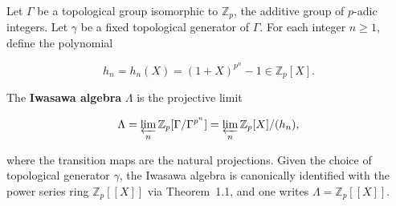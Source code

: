 Let $\Gamma$ be a topological group isomorphic to $\mathbb{Z}_p$, the additive group of $p$-adic integers. Let $\gamma$ be a fixed topological generator of $\Gamma$. For each integer $n \geq 1$, define the polynomial

$$h_n = h_n(X) = (1 + X)^{p^n} - 1 \in \mathbb{Z}_p[X].$$

The \textbf{Iwasawa algebra} $\Lambda$ is the projective limit

$$\Lambda = \varprojlim_n \mathbb{Z}_p[\Gamma/\Gamma^{p^n}] = \varprojlim_n \mathbb{Z}_p[X]/(h_n),$$

where the transition maps are the natural projections. Given the choice of topological generator $\gamma$, the Iwasawa algebra is canonically identified with the power series ring $\mathbb{Z}_p[[X]]$ via Theorem~1.1, and one writes $\Lambda = \mathbb{Z}_p[[X]]$.
